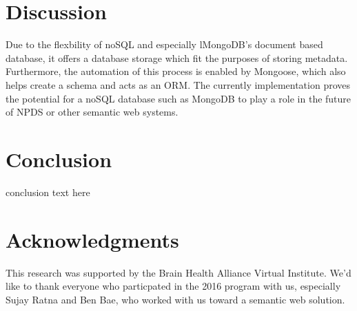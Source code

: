 \documentclass[10pt,twocolumn,twoside]{article}
\begin{document}
\section*{Discussion}
	Due to the flexbility of noSQL and especially lMongoDB's document based database, it offers a database storage which fit the purposes of storing metadata. Furthermore, the automation of this process is enabled by Mongoose, which also helps create a schema and acts as an ORM. The currently implementation proves the potential for a noSQL database such as MongoDB to play a role in the future of NPDS or other semantic web systems. 


\section*{Conclusion}
\label{secConclusion}
conclusion text here


\section*{Acknowledgments}
This research was supported by the Brain Health Alliance Virtual Institute. We'd like to thank everyone who particpated in the 2016 program with us, especially Sujay Ratna and Ben Bae, who worked with us toward a semantic web solution. 
\end{document}

